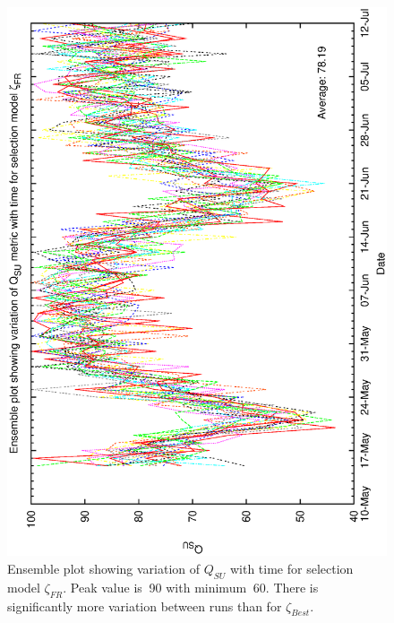 \begin{figure}[h]
\begin{center}   
  \includegraphics[scale=0.5, angle=-90]{figures/biasfr_ensemble.eps}
  \caption[Ensemble plot showing variation of $Q_{SU}$ with time for selection model $\zeta_{FR}$.] 
  {Ensemble plot showing variation of $Q_{SU}$ with time for selection model $\zeta_{FR}$. Peak value is $~$90 with minimum $~$60. There is significantly more variation between runs than for $\zeta_{Best}$.}
  \label{fig:ensemble_fixrankbias}
\end{center}
\end{figure}

